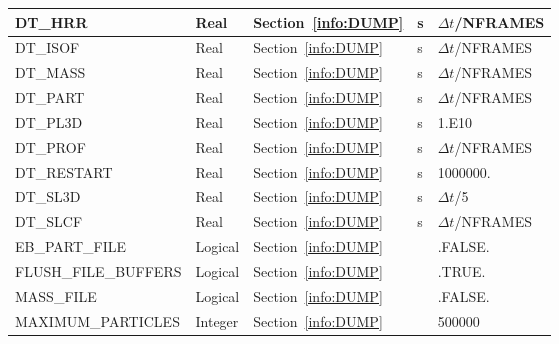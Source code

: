 \documentclass[11pt]{book}
\begin{document}
\begin{longtable}{@{\extracolsep{\fill}}|l|l|l|l|l|}
{\ct DT\_HRR}                       & Real         & Section~\ref{info:DUMP}                &  s        & $\Delta t${\ct /NFRAMES}       \\ \hline
{\ct DT\_ISOF}                      & Real         & Section~\ref{info:DUMP}                &  s        & $\Delta t${\ct /NFRAMES}       \\ \hline
{\ct DT\_MASS}                      & Real         & Section~\ref{info:DUMP}                &  s        & $\Delta t${\ct /NFRAMES}       \\ \hline
{\ct DT\_PART}                      & Real         & Section~\ref{info:DUMP}                &  s        & $\Delta t${\ct /NFRAMES}       \\ \hline
{\ct DT\_PL3D}                      & Real         & Section~\ref{info:DUMP}                &  s        & 1.E10                          \\ \hline
{\ct DT\_PROF}                      & Real         & Section~\ref{info:DUMP}                &  s        & $\Delta t${\ct /NFRAMES}       \\ \hline
{\ct DT\_RESTART}                   & Real         & Section~\ref{info:DUMP}                &  s        & 1000000.                       \\ \hline
{\ct DT\_SL3D}                      & Real         & Section~\ref{info:DUMP}                &  s        & $\Delta t${\ct /5}             \\ \hline
{\ct DT\_SLCF}                      & Real         & Section~\ref{info:DUMP}                &  s        & $\Delta t${\ct /NFRAMES}       \\ \hline
{\ct EB\_PART\_FILE}                & Logical      & Section~\ref{info:DUMP}                &           & {\ct .FALSE.}                  \\ \hline
{\ct FLUSH\_FILE\_BUFFERS}          & Logical      & Section~\ref{info:DUMP}                &           & {\ct .TRUE.}                   \\ \hline
{\ct MASS\_FILE}                    & Logical      & Section~\ref{info:DUMP}                &           & {\ct .FALSE.}                  \\ \hline
{\ct MAXIMUM\_PARTICLES}            & Integer      & Section~\ref{info:DUMP}                &           & 500000                         \\ \hline

\end{longtable}
\end{document}
